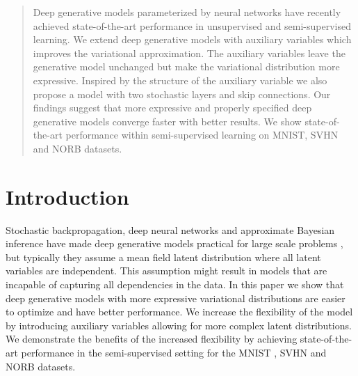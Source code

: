 \documentclass{article}
\begin{document}
 


\begin{abstract}
Deep generative models parameterized by neural networks have recently achieved state-of-the-art performance in unsupervised and semi-supervised learning. We extend deep generative models with auxiliary variables which improves the variational approximation. The auxiliary variables leave the generative model unchanged but make the variational distribution more expressive. Inspired by the structure of the auxiliary variable we also propose a model with two stochastic layers and skip connections. Our findings suggest that more expressive and properly specified deep generative models converge faster with better results. We show state-of-the-art performance within semi-supervised learning on MNIST, SVHN and NORB datasets.
\vspace{-4mm}
\end{abstract}

\section{Introduction}
\label{introduction}
Stochastic backpropagation, deep neural networks and approximate Bayesian inference have made deep generative models practical for large scale problems \citep{Kingma13,Rezende14}, but typically they assume a mean field latent distribution where all latent variables are independent. This assumption might result in models that are incapable of capturing all dependencies in the data. In this paper we show that deep generative models with more expressive variational distributions are easier to optimize and have better performance. We increase the flexibility of the model by introducing auxiliary variables \citep{Agakov04} allowing for more complex latent distributions. We demonstrate the benefits of the increased flexibility by achieving state-of-the-art performance in the semi-supervised setting for the MNIST \citep{LeCun98}, SVHN \citep{Netzer2011} and NORB \citep{LeCun2004} datasets.
\end{document}
